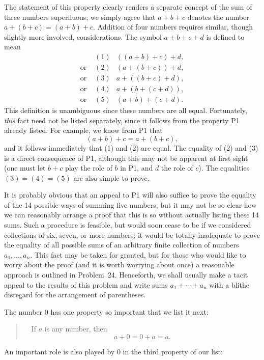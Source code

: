 The statement of this property clearly renders a separate concept of the sum
of three numbers superfluous; we simply agree that $a+b+c$ denotes the number
$a+(b+c)=(a+b)+c$. Addition of four numbers requires similar, though slightly
more involved, considerations. The symbol $a+b+c+d$ is defined to mean
\begin{align*}
&(1) & ((a+b)+c)+d,\\
\text{or } &(2) & (a+(b+c))+d,\\
\text{or } &(3) & a+((b+c)+d),\\
\text{or } &(4) & a+(b+(c+d)),\\
\text{or } &(5) & (a+b)+(c+d).
\end{align*}
This definition is unambiguous since these numbers are all equal.
Fortunately, \emph{this} fact need not be listed separately, since it follows
from the property P1 already listed. For example, we know from P1 that
\[ (a+b)+c = a+(b+c), \]
and it follows immediately that (1) and (2) are equal. The equality of (2)
and (3) is a direct consequence of P1, although this may not be apparent at
first sight (one must let $b+c$ play the role of $b$ in P1, and $d$ the role
of $c$). The equalities $(3)=(4)=(5)$ are also simple to prove.

It is probably obvious that an appeal to P1 will also suffice to prove the
equality of the 14 possible ways of summing five numbers, but it may not be so
clear how we can reasonably arrange a proof that this is so without actually
listing these 14 sums. Such a procedure is feasible, but would soon cease to
be if we considered collections of six, seven, or more numbers; it would be
totally inadequate to prove the equality of all possible sums of an arbitrary
finite collection of numbers $a_1, \dots, a_n$. This fact may be taken for
granted, but for those who would like to worry about the proof (and it is
worth worrying about once) a reasonable approach is outlined in Problem~24.
Henceforth, we shall usually make a tacit appeal to the results of this
problem and write sums $a_1 + \cdots + a_n$ with a blithe disregard for the
arrangement of parentheses.

The number $0$ has one property so important that we list it next:

\begin{quote}
\ \ If $a$ is any number, then
\[ a + 0 = 0 + a = a. \]
\end{quote}

An important role is also played by $0$ in the third property of our list:

